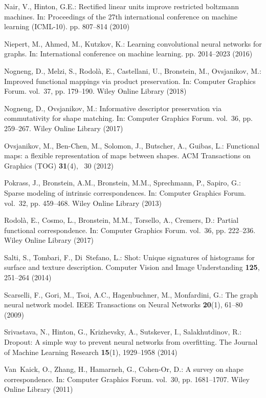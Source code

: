 \documentclass[runningheads]{llncs}
\begin{document}
\begin{thebibliography}{10}
Nair, V., Hinton, G.E.: Rectified linear units improve restricted boltzmann
  machines. In: Proceedings of the 27th international conference on machine
  learning (ICML-10). pp. 807--814 (2010)

Niepert, M., Ahmed, M., Kutzkov, K.: Learning convolutional neural networks for
  graphs. In: International conference on machine learning. pp. 2014--2023
  (2016)

Nogneng, D., Melzi, S., Rodol{\`a}, E., Castellani, U., Bronstein, M.,
  Ovsjanikov, M.: Improved functional mappings via product preservation. In:
  Computer Graphics Forum. vol.~37, pp. 179--190. Wiley Online Library (2018)

Nogneng, D., Ovsjanikov, M.: Informative descriptor preservation via
  commutativity for shape matching. In: Computer Graphics Forum. vol.~36, pp.
  259--267. Wiley Online Library (2017)

Ovsjanikov, M., Ben-Chen, M., Solomon, J., Butscher, A., Guibas, L.: Functional
  maps: a flexible representation of maps between shapes. ACM Transactions on
  Graphics (TOG)  \textbf{31}(4), ~30 (2012)

Pokrass, J., Bronstein, A.M., Bronstein, M.M., Sprechmann, P., Sapiro, G.:
  Sparse modeling of intrinsic correspondences. In: Computer Graphics Forum.
  vol.~32, pp. 459--468. Wiley Online Library (2013)

Rodol{\`a}, E., Cosmo, L., Bronstein, M.M., Torsello, A., Cremers, D.: Partial
  functional correspondence. In: Computer Graphics Forum. vol.~36, pp.
  222--236. Wiley Online Library (2017)

Salti, S., Tombari, F., Di~Stefano, L.: Shot: Unique signatures of histograms
  for surface and texture description. Computer Vision and Image Understanding
  \textbf{125},  251--264 (2014)

Scarselli, F., Gori, M., Tsoi, A.C., Hagenbuchner, M., Monfardini, G.: The
  graph neural network model. IEEE Transactions on Neural Networks
  \textbf{20}(1),  61--80 (2009)

Srivastava, N., Hinton, G., Krizhevsky, A., Sutskever, I., Salakhutdinov, R.:
  Dropout: A simple way to prevent neural networks from overfitting. The
  Journal of Machine Learning Research  \textbf{15}(1),  1929--1958 (2014)

Van~Kaick, O., Zhang, H., Hamarneh, G., Cohen-Or, D.: A survey on shape
  correspondence. In: Computer Graphics Forum. vol.~30, pp. 1681--1707. Wiley
  Online Library (2011)

\end{thebibliography}
\end{document}
